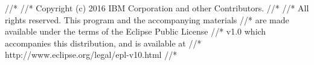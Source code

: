 //*
//* Copyright (c) 2016 IBM Corporation and other Contributors.
//*
//* All rights reserved. This program and the accompanying materials
//* are made available under the terms of the Eclipse Public License 
//* v1.0 which accompanies this distribution, and is available at
//* http://www.eclipse.org/legal/epl-v10.html
//*
